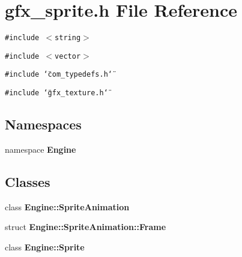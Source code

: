 \section{gfx\_\-sprite.h File Reference}
\label{gfx__sprite_8h}
{\tt \#include $<$string$>$}\par
{\tt \#include $<$vector$>$}\par
{\tt \#include \char`\"{}com\_\-typedefs.h\char`\"{}}\par
{\tt \#include \char`\"{}gfx\_\-texture.h\char`\"{}}\par
\subsection*{Namespaces}
\begin{CompactItemize}
\item 
namespace {\bf Engine}
\end{CompactItemize}
\subsection*{Classes}
\begin{CompactItemize}
\item 
class {\bf Engine::SpriteAnimation}
\item 
struct \textbf{Engine::SpriteAnimation::Frame}
\item 
class {\bf Engine::Sprite}
\end{CompactItemize}
